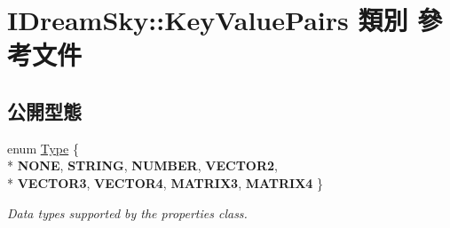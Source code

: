 \hypertarget{class_i_dream_sky_1_1_key_value_pairs}{}\section{I\+Dream\+Sky\+:\+:Key\+Value\+Pairs 類別 參考文件}
\label{class_i_dream_sky_1_1_key_value_pairs}
\subsection*{公開型態}
\begin{DoxyCompactItemize}
\item 
enum \hyperlink{class_i_dream_sky_1_1_key_value_pairs_a58bfd40015fc806fd3835c50b75ed179}{Type} \{ \\*
{\bfseries N\+O\+NE}, 
{\bfseries S\+T\+R\+I\+NG}, 
{\bfseries N\+U\+M\+B\+ER}, 
{\bfseries V\+E\+C\+T\+O\+R2}, 
\\*
{\bfseries V\+E\+C\+T\+O\+R3}, 
{\bfseries V\+E\+C\+T\+O\+R4}, 
{\bfseries M\+A\+T\+R\+I\+X3}, 
{\bfseries M\+A\+T\+R\+I\+X4}
 \}\hypertarget{class_i_dream_sky_1_1_key_value_pairs_a58bfd40015fc806fd3835c50b75ed179}{}\label{class_i_dream_sky_1_1_key_value_pairs_a58bfd40015fc806fd3835c50b75ed179}
\begin{DoxyCompactList}\small\item\em Data types supported by the properties class. \end{DoxyCompactList}
\end{DoxyCompactItemize}

